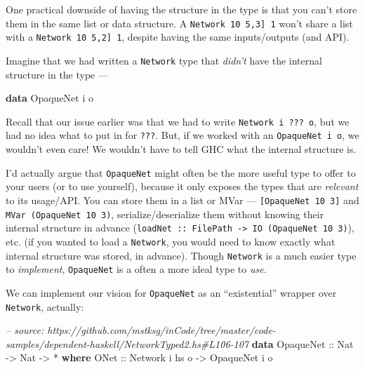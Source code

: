 \documentclass[]{article}
\newenvironment{Shaded}{}{}
\newcommand{\KeywordTok}[1]{\textcolor[rgb]{0.00,0.44,0.13}{\textbf{{#1}}}}
\newcommand{\DataTypeTok}[1]{\textcolor[rgb]{0.56,0.13,0.00}{{#1}}}
\newcommand{\CommentTok}[1]{\textcolor[rgb]{0.38,0.63,0.69}{\textit{{#1}}}}
\newcommand{\OtherTok}[1]{\textcolor[rgb]{0.00,0.44,0.13}{{#1}}}
\newcommand{\FunctionTok}[1]{\textcolor[rgb]{0.02,0.16,0.49}{{#1}}}
\newcommand{\NormalTok}[1]{{#1}}
\begin{document}
One practical downside of having the structure in the type is that you can't
store them in the same list or data structure. A
\texttt{Network\ 10\ \textquotesingle{}{[}5,3{]}\ 1} won't share a list with a
\texttt{Network\ 10\ \textquotesingle{}{[}5,2{]}\ 1}, despite having the same
inputs/outputs (and API).

Imagine that we had written a \texttt{Network} type that \emph{didn't} have the
internal structure in the type ---

\begin{Shaded}
\begin{Highlighting}[]
\KeywordTok{data} \DataTypeTok{OpaqueNet} \NormalTok{i o}
\end{Highlighting}
\end{Shaded}

Recall that our issue earlier was that we had to write
\texttt{Network\ i\ ???\ o}, but we had no idea what to put in for \texttt{???}.
But, if we worked with an \texttt{OpaqueNet\ i\ o}, we wouldn't even care! We
wouldn't have to tell GHC what the internal structure is.

I'd actually argue that \texttt{OpaqueNet} might often be the more useful type
to offer to your users (or to use yourself), because it only exposes the types
that are \emph{relevant} to its usage/API. You can store them in a list or MVar
--- \texttt{{[}OpaqueNet\ 10\ 3{]}} and \texttt{MVar\ (OpaqueNet\ 10\ 3)},
serialize/deserialize them without knowing their internal structure in advance
(\texttt{loadNet\ ::\ FilePath\ -\textgreater{}\ IO\ (OpaqueNet\ 10\ 3)}), etc.
(if you wanted to load a \texttt{Network}, you would need to know exactly what
internal structure was stored, in advance). Though \texttt{Network} is a much
easier type to \emph{implement}, \texttt{OpaqueNet} is a often a more ideal type
to \emph{use}.

We can implement our vision for \texttt{OpaqueNet} as an ``existential'' wrapper
over \texttt{Network}, actually:

\begin{Shaded}
\begin{Highlighting}[]
\CommentTok{-- source: https://github.com/mstksg/inCode/tree/master/code-samples/dependent-haskell/NetworkTyped2.hs#L106-107}
\KeywordTok{data} \DataTypeTok{OpaqueNet}\OtherTok{ ::} \DataTypeTok{Nat} \OtherTok{->} \DataTypeTok{Nat} \OtherTok{->} \FunctionTok{*} \KeywordTok{where}
    \DataTypeTok{ONet}\OtherTok{ ::} \DataTypeTok{Network} \NormalTok{i hs o }\OtherTok{->} \DataTypeTok{OpaqueNet} \NormalTok{i o}
\end{Highlighting}
\end{Shaded}
\end{document}
